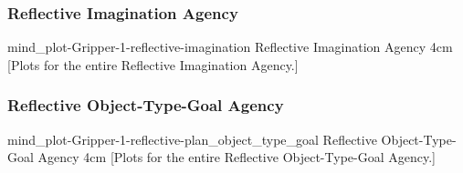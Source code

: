 {\newpage
  \noindent\begin{minipage}{\textwidth}
    \subsubsection{Reflective Imagination Agency}
    \experimentcausegroupplots{\dataappendixmaxtime}
                           {\dataappendixexperimentonemaxtime}
                           {\dataappendixexperimenttwomaxtime}
                           {\dataappendixexperimentthreemaxtime}
                           {\dataappendixexperimentonename}
                           {\dataappendixexperimenttwoname}
                           {\dataappendixexperimentthreename}
                           {\dataappendixexperimentoneprettyname}
                           {\dataappendixexperimenttwoprettyname}
                           \experimentcausegroupplotscontinued{\dataappendixexperimentthreeprettyname}
                                                              {mind_plot-Gripper-1-reflective-imagination}
                                                              {Reflective Imagination Agency}
                                                              {\experimentdatacommontablereference}
                                                              {4cm}
    \experimentdatablocksworldexample
    [Plots for the entire
      Reflective Imagination Agency.]{}
  \label{figure:mind_plot-Gripper-1-reflective-imagination}
  \end{minipage}
}
{\newpage
  \noindent\begin{minipage}{\textwidth}
    \subsubsection{Reflective Object-Type-Goal Agency}
    \experimentcausegroupplots{\dataappendixmaxtime}
                           {\dataappendixexperimentonemaxtime}
                           {\dataappendixexperimenttwomaxtime}
                           {\dataappendixexperimentthreemaxtime}
                           {\dataappendixexperimentonename}
                           {\dataappendixexperimenttwoname}
                           {\dataappendixexperimentthreename}
                           {\dataappendixexperimentoneprettyname}
                           {\dataappendixexperimenttwoprettyname}
                           \experimentcausegroupplotscontinued{\dataappendixexperimentthreeprettyname}
                                                              {mind_plot-Gripper-1-reflective-plan_object_type_goal}
                                                              {Reflective Object-Type-Goal Agency}
                                                              {\experimentdatacommontablereference}
                                                              {4cm}
    \experimentdatablocksworldexample
    [Plots for the entire
      Reflective Object-Type-Goal Agency.]{}
  \label{figure:mind_plot-Gripper-1-reflective-plan_object_type_goal}
  \end{minipage}
}
